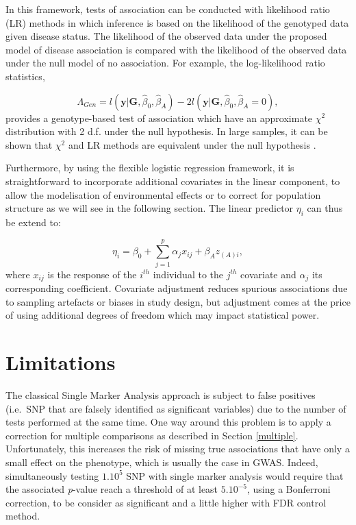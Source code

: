 \documentclass[]{book}
\begin{document}
In this framework, tests of association can be conducted with likelihood
ratio (LR) methods in which inference is based on the likelihood of the
genotyped data given disease status. The likelihood of the observed data
under the proposed model of disease association is compared with the
likelihood of the observed data under the null model of no association.
For example, the log-likelihood ratio statistics,

\[\Lambda_{Gen} =  l(\mathbf{y} | \mathbf{G},\hat{\beta}_0,\hat{\beta}_A) - 2 l(\mathbf{y} | \mathbf{G},\hat{\beta}_0,\hat{\beta}_A = 0),\]
provides a genotype-based test of association which have an approximate
\(\chi^2\) distribution with 2 d.f. under the null hypothesis. In large
samples, it can be shown that \(\chi^2\) and LR methods are equivalent
under the null hypothesis \citep{rice2006mathematical}.

Furthermore, by using the flexible logistic regression framework, it is
straightforward to incorporate additional covariates in the linear
component, to allow the modelisation of environmental effects or to
correct for population structure as we will see in the following
section. The linear predictor \(\eta_i\) can thus be extend to:

\[\eta_i = \beta_0 + \sum_{j=1}^p \alpha_j x_{ij} + \beta_A z_{(A)i},\]
where \(x_{ij}\) is the response of the \(i^{th}\) individual to the
\(j^{th}\) covariate and \(\alpha_j\) its corresponding coefficient.
Covariate adjustment reduces spurious associations due to sampling
artefacts or biases in study design, but adjustment comes at the price
of using additional degrees of freedom which may impact statistical
power.

\hypertarget{GWASlimits}{%
\section{Limitations}\label{GWASlimits}}

The classical Single Marker Analysis approach is subject to false
positives (i.e.~SNP that are falsely identified as significant
variables) due to the number of tests performed at the same time. One
way around this problem is to apply a correction for multiple
comparisons as described in Section \ref{multiple}. Unfortunately,
this increases the risk of missing true associations that have only a
small effect on the phenotype, which is usually the case in GWAS.
Indeed, simultaneously testing \(1.10^5\) SNP with single marker analysis
would require that the associated \emph{p}-value reach a threshold of at
least \(5.10^{-5}\), using a Bonferroni correction, to be consider as
significant and a little higher with FDR control method.
\end{document}

